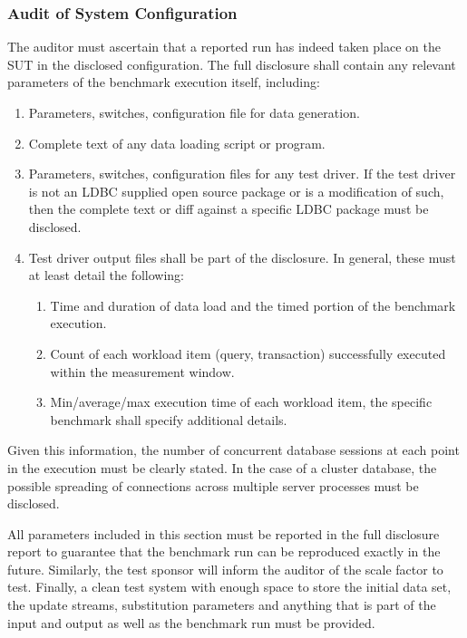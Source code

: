 \subsubsection{Audit of System Configuration}
The auditor must ascertain that a reported run has indeed taken place on the SUT in the disclosed configuration.
The full disclosure shall contain any relevant parameters of the benchmark execution itself, including:
\begin{enumerate}
    \item Parameters, switches, configuration file for data generation.
    \item Complete text of any data loading script or program.
    \item Parameters, switches, configuration files for any test driver. If the test driver is not an LDBC supplied open source package or is a modification of such, then the complete text or diff against a specific LDBC package must be disclosed.
    \item Test driver output files shall be part of the disclosure. In general, these must at least detail the following:
    \begin{enumerate}[label=\roman*)]
        \item Time and duration of data load and the timed portion of the benchmark execution.
        \item Count of each workload item (\eg query, transaction) successfully executed within the measurement window.
        \item Min/average/max execution time of each workload item, the specific benchmark shall specify additional details.
    \end{enumerate}
\end{enumerate}

Given this information, the number of concurrent database sessions at each point in the execution must be clearly stated. In the case of a cluster database, the possible spreading of connections across multiple server processes must be disclosed.


All parameters included in this section must be reported in the full disclosure report to guarantee that the benchmark run can be reproduced exactly in the future. Similarly, the test sponsor will inform the auditor of the scale factor to test. Finally, a clean test system with enough space to store the initial data set, the update streams, substitution parameters and anything that is part of the input and output as well as the benchmark run must be provided.

